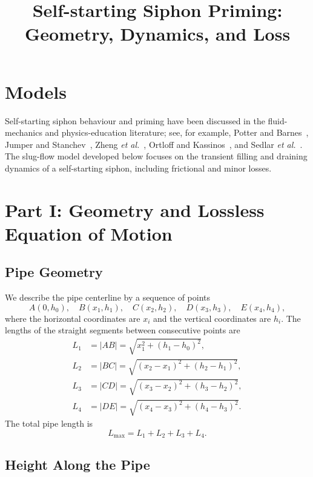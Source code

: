 \documentclass[11pt]{article}
\title{Self-starting Siphon Priming: Geometry, Dynamics, and Loss}
\author{}
\date{}
\begin{document}
\maketitle

\section*{Models}

\noindent
Self-starting siphon behaviour and priming have been discussed in the
fluid-mechanics and physics-education literature; see, for example,
Potter and Barnes~\cite{potter_siphon}, Jumper and
Stanchev~\cite{jumper_siphon}, Zheng \emph{et
al.}~\cite{zheng_siphon}, Ortloff and Kassinos~\cite{ortloff_aspendos},
and Sedlar \emph{et al.}~\cite{sedlar_siphon}.  The slug-flow model
developed below focuses on the transient filling and draining dynamics
of a self-starting siphon, including frictional and minor losses.

\section{Part I: Geometry and Lossless Equation of Motion}

\subsection{Pipe Geometry}

We describe the pipe centerline by a sequence of points
\[
A(0, h_0),\quad B(x_1, h_1),\quad C(x_2, h_2),\quad D(x_3, h_3),\quad E(x_4, h_4),
\]
where the horizontal coordinates are $x_i$ and the vertical coordinates are $h_i$.
The lengths of the straight segments between consecutive points are
\begin{align*}
L_1 &= \lvert AB \rvert = \sqrt{x_1^2 + (h_1 - h_0)^2}, \\
L_2 &= \lvert BC \rvert = \sqrt{(x_2 - x_1)^2 + (h_2 - h_1)^2}, \\
L_3 &= \lvert CD \rvert = \sqrt{(x_3 - x_2)^2 + (h_3 - h_2)^2}, \\
L_4 &= \lvert DE \rvert = \sqrt{(x_4 - x_3)^2 + (h_4 - h_3)^2}.
\end{align*}
The total pipe length is
\[
L_{\max} = L_1 + L_2 + L_3 + L_4.
\]

\subsection{Height Along the Pipe}
\end{document}
